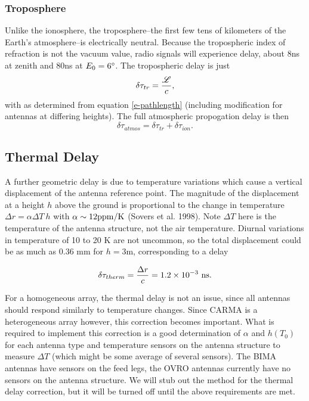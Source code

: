 \documentclass[preprint]{aastex}
\newcommand{\scrL}{ %
   \ifmmode{{\mathscr L}}
   \else{${\mathscr L}$\/}
   \fi}
\def\degree{\ifmmode{^\circ} \else{$^\circ$}\fi}
\def\nexpo#1#2{\ifmmode{#1 \times 10^{#2}}\else{$#1 \times 10^{#2}$}\fi}
\begin{document}
\subsubsection{Troposphere\label{s-troposphere}}

Unlike the ionosphere, the troposphere--the first few tens of kilometers of
the Earth's atmosphere--is electrically neutral. Because the tropospheric
index of refraction is not the vacuum value, radio signals will experience
delay, about 8\thinspace ns at zenith and 80\thinspace ns at $E_0=6\degree$.
The tropospheric delay is just 
\begin{equation}
\delta\tau_{tr} = \frac{\scrL}{c},
\end{equation}
\noindent 
with \scrL as determined from equation \ref{e-pathlength} (including
modification for antennas at differing heights). The full 
atmospheric propogation delay is then 
\begin{equation}
\delta\tau_{atmos} = \delta\tau_{tr}+\delta\tau_{ion}.
\end{equation}

\subsection{Thermal Delay\label{s-thermal}}
A further geometric delay is due to temperature variations which cause
a vertical displacement of the antenna reference point.  The magnitude
of the displacement at a height $h$ above the ground is proportional to
the change in temperature $\Delta r = \alpha\Delta T~h$ with $\alpha \sim 12
{\rm ppm/K}$ (Sovers et al. 1998). Note $\Delta T$ here is the
temperature of the antenna structure, not the air temperature.
Diurnal variations in temperature of 10 to 20 K are not uncommon,
so the total displacement could be as much as 0.36 mm for $h = 3$m, 
corresponding to a delay

\begin{equation}
\delta\tau_{therm} = \frac{\Delta r}{c} = \nexpo{1.2}{-3}~{\rm ns}.
\label{e-thermal}
\end{equation}

For a homogeneous array, the thermal delay is not an issue, since
all antennas should respond similarly to temperature changes.
Since CARMA is a heterogeneous array however, this correction becomes
important. What is required to implement this correction is 
a good determination of $\alpha$ and $h(T_0)$ for each antenna type and
temperature sensors on the antenna structure to measure $\Delta T$ (which
might be some average of several sensors).
The BIMA antennas have sensors on the feed legs, the OVRO antennas currently
have no sensors on the antenna structure.  We will stub out the method
for the thermal delay correction, but it will be turned off until
the above requirements are met.
\end{document}

